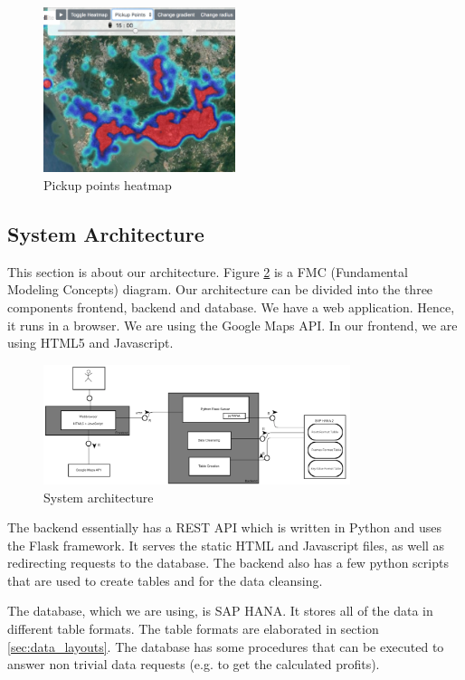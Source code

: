 \documentclass[10pt]{sig-alternate}
\begin{document}
\begin{figure}[ht]
\centering
\includegraphics[width=0.5\textwidth]{img/pickup.png}
\caption{Pickup points heatmap}
\label{fig:pickup}
\end{figure}

\subsection{System Architecture}

This section is about our architecture. Figure \ref{fig:architecture} is a FMC (Fundamental Modeling Concepts) diagram. Our architecture can be divided into the three components frontend, backend and database. We have a web application. Hence, it runs in a browser. We are using the Google Maps API. In our frontend, we are using HTML5 and Javascript.\\

\begin{figure}
\centering
\includegraphics[width=0.8\textwidth]{img/architecture.png}
\caption{System architecture}
\label{fig:architecture}
\end{figure}

The backend essentially has a REST API which is written in Python and uses the Flask framework. It serves the static HTML and Javascript files, as well as redirecting requests to the database. The backend also has a few python scripts that are used to create tables and for the data cleansing.

The database, which we are using, is SAP HANA. It stores all of the data in different table formats. The table formats are elaborated in section \ref{sec:data_layouts}. The database has some procedures that can be executed to answer non trivial data requests (e.g. to get the calculated profits). 
\end{document}
